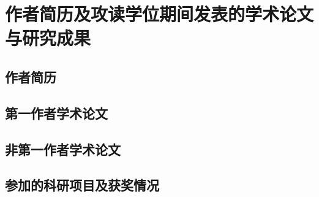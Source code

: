 \chapter*{作者简历及攻读学位期间发表的学术论文与研究成果}

\section*{作者简历}


\section*{第一作者学术论文}
\begin{refsection}
\nocite{*}

\printbibliography[heading=none,keyword={own}]
\end{refsection}

\section*{非第一作者学术论文}

\section*{参加的科研项目及获奖情况}